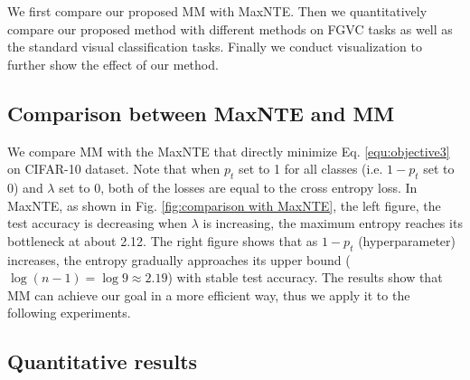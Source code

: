 \documentclass{article}
\theoremstyle{definition}
\begin{document}
We first compare our proposed MM with MaxNTE. Then we quantitatively compare our proposed method with different methods on FGVC tasks  as well as the standard visual classification tasks. Finally we conduct visualization to further show the effect of our method.

\subsection{Comparison between MaxNTE and MM}
We compare MM with the MaxNTE that directly minimize Eq. \ref{equ:objective3} on CIFAR-10 dataset. Note that when $p_t$ set to 1 for all classes (i.e. $1-p_t$ set to 0) and $\lambda$ set to 0, both of the losses are equal to the cross entropy loss. In MaxNTE, as shown in Fig. \ref{fig:comparison with MaxNTE}, the left figure, the test accuracy is decreasing when $\lambda$ is increasing, the maximum entropy reaches its bottleneck at about 2.12. The right figure shows that as $1-p_t$ (hyperparameter) increases, the entropy gradually approaches its upper bound ($\log(n-1)=\log9\approx2.19$) with stable test accuracy. The results show that MM can achieve our goal in a more efficient way, thus we apply it to the following experiments.

\subsection{Quantitative results}
\end{document}
